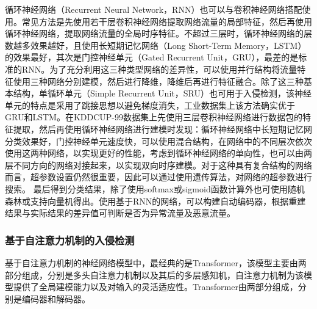 循环神经网络（Recurrent Neural Network，RNN）也可以与卷积神经网络搭配使用。常见方法是先使用若干层卷积神经网络提取网络流量的局部特征，然后再使用循环神经网络，提取网络流量的全局时序特征。不超过三层时，循环神经网络的层数越多效果越好，且使用长短期记忆网络（Long Short-Term Memory，LSTM）的效果最好，其次是门控神经单元（Gated Recurrent Unit，GRU），最差的是标准的RNN\cite{10.1109/ICACCI.2017.8126009,10.1016/j.comcom.2022.12.010}。为了充分利用这三种类型网络的差异性，可以使用并行结构将流量特征使用三种网络分别建模，然后进行降维，降维后再进行特征融合\cite{10.1016/j.compeleceng.2022.108156}。除了这三种基本结构，单循环单元（Simple Recurrent Unit，SRU）也可用于入侵检测，该神经单元的特点是采用了跳接思想以避免梯度消失，工业数据集上该方法确实优于GRU和LSTM\cite{10.1016/j.compeleceng.2021.107049}。在KDDCUP-99数据集上先使用三层卷积神经网络进行数据包的特征提取，然后再使用循环神经网络进行建模时发现：循环神经网络中长短期记忆网分类效果好，门控神经单元速度快，可以使用混合结构，在网络中的不同层次依次使用这两种网络，以实现更好的性能，考虑到循环神经网络的单向性，也可以由两层不同方向的网络对接起来，以实现双向时序建模\cite{10.1016/j.jksuci.2022.10.019}。对于这种具有复合结构的网络而言，超参数设置仍然很重要，因此可以通过使用遗传算法，对网络的超参数进行搜索\cite{10.1007/s11042-021-11271-7}。
最后得到分类结果，除了使用softmax或sigmoid函数计算外也可使用随机森林或支持向量机得出\cite{10.1016/j.compeleceng.2022.108156}。使用基于RNN的网络，可以构建自动编码器，根据重建结果与实际结果的差异值可判断是否为异常流量及恶意流量\cite{10.1109/TCAD.2020.3012749}。
\subsubsection{基于自注意力机制的入侵检测}
基于自注意力机制的神经网络模型中，最经典的是Transformer\cite{NIPS2017_3f5ee243}，该模型主要由两部分组成，分别是多头自注意力机制以及其后的多层感知机，自注意力机制为该模型提供了全局建模能力以及对输入的灵活适应性。Transformer由两部分组成，分别是编码器和解码器。


